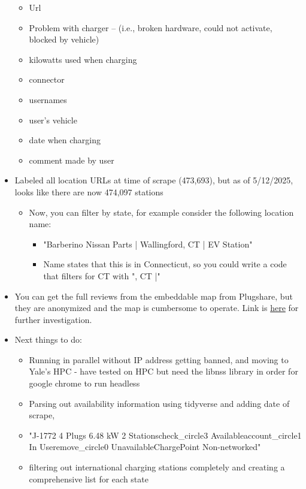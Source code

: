 \documentclass[12pt]{article}
\begin{document}
\begin{itemize}
\begin{itemize}
\item Url
\item Problem with charger -- (i.e., broken hardware, could not activate, blocked by vehicle)
\item kilowatts used when charging
\item connector
\item usernames
\item user's vehicle
\item date when charging
\item comment made by user
\end{itemize}
\item Labeled all location URLs at time of scrape (473,693), but as of 5/12/2025, looks like there are now 474,097 stations
\begin{itemize}
\item Now, you can filter by state, for example consider the following location name:
\begin{itemize}
\item "Barberino Nissan Parts | Wallingford, CT | EV Station"
\item Name states that this is in Connecticut, so you could write a code that filters for CT with ", CT |"
\end{itemize}
\end{itemize}
\item You can get the full reviews from the embeddable map from Plugshare, but they are anonymized and the map is cumbersome to operate. Link is \href{https://developer.plugshare.com/embed.html}{here} for further investigation.
\item Next things to do:
\begin{itemize}
\item Running in parallel without IP address getting banned, and moving to Yale's HPC - have tested on HPC but need the libnss library in order for google chrome to run headless
\item Parsing out availability information using tidyverse and adding date of scrape,
\item "J-1772 4 Plugs 6.48 kW 2 Stationscheck\_circle3 Availableaccount\_circle1 In Useremove\_circle0 UnavailableChargePoint Non-networked"
\item filtering out international charging stations completely and creating a comprehensive list for each state
\end{itemize}
\end{itemize}
\end{document}
